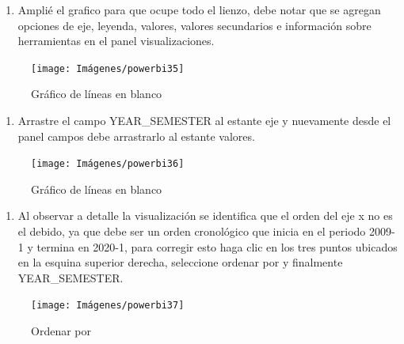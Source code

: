 \documentclass[
]{book}
\providecommand{\tightlist}{%
  \setlength{\itemsep}{0pt}\setlength{\parskip}{0pt}}
\begin{document}
\begin{enumerate}
\def\labelenumi{\arabic{enumi}.}
\setcounter{enumi}{2}
\tightlist
\item
  Amplié el grafico para que ocupe todo el lienzo, debe notar que se agregan opciones de eje, leyenda, valores, valores secundarios e información sobre herramientas en el panel visualizaciones.
\end{enumerate}

\begin{figure}

{\centering \texttt{[image: Imágenes/powerbi35]} 

}

\caption{Gráfico de líneas en blanco}\label{fig:paso3lineaspowerbi-fig}
\end{figure}

\begin{enumerate}
\def\labelenumi{\arabic{enumi}.}
\setcounter{enumi}{3}
\tightlist
\item
  Arrastre el campo YEAR\_SEMESTER al estante eje y nuevamente desde el panel campos debe arrastrarlo al estante valores.
\end{enumerate}

\begin{figure}

{\centering \texttt{[image: Imágenes/powerbi36]} 

}

\caption{Gráfico de líneas en blanco}\label{fig:paso4lineaspowerbi-fig}
\end{figure}

\begin{enumerate}
\def\labelenumi{\arabic{enumi}.}
\setcounter{enumi}{4}
\tightlist
\item
  Al observar a detalle la visualización se identifica que el orden del eje x no es el debido, ya que debe ser un orden cronológico que inicia en el periodo 2009-1 y termina en 2020-1, para corregir esto haga clic en los tres puntos ubicados en la esquina superior derecha, seleccione ordenar por y finalmente YEAR\_SEMESTER.
\end{enumerate}

\begin{figure}

{\centering \texttt{[image: Imágenes/powerbi37]} 

}

\caption{Ordenar por}\label{fig:paso5lineaspowerbi-fig}
\end{figure}
\end{document}
